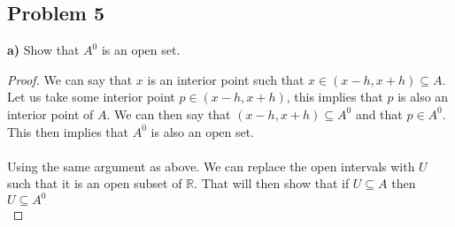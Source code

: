\documentclass[12pt]{article}
\newcommand{\R}{\mathbb{R}}
\begin{document}
\subsection*{Problem 5}
\textbf{a)} Show that $A^0$ is an open set.
\begin{proof}
We can say that $x$ is an interior point such that $x \in (x-h,x+h) \subseteq A$. Let us take some interior point $p \in (x-h,x+h)$, this implies that $p$ is also an interior point of $A$. We can then say that $(x-h,x+h) \subseteq A^0$ and that $p \in A^0$. This then implies that $A^0$ is also an open set.\\\\
Using the same argument as above. We can replace the open intervals with $U$ such that it is an open subset of $\R$. That will then show that if $U \subseteq A$ then $U \subseteq A^0$\\
\end{proof}
\end{document}
